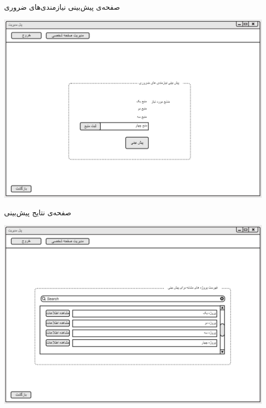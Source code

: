 \vspace{1cm}
صفحه‌ی پیش‌بینی نیازمندی‌های ضروری
\begin{center}
\includegraphics[width=\textwidth]{Prototype/Predict/RequirementsPrediction.png}
\end{center}

\newpage
\vspace{1cm}
صفحه‌ی نتایج پیش‌بینی
\begin{center}
\includegraphics[width=\textwidth]{Prototype/Predict/Result.png}
\end{center}